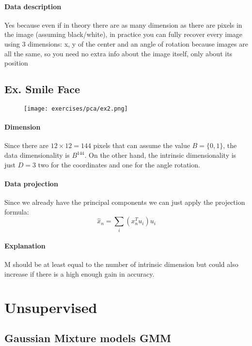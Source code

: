 \paragraph{Data description}
Yes because even if in theory there are as many dimension as there are pixels in the image (assuming black/white), in practice you can fully recover every image using 3 dimensions: x, y of the center and an angle of rotation because images are all the same, so you need no extra info about the image itself, only about its position

\subsection{Ex. Smile Face }

\begin{figure}[H]
    \centering
    \texttt{[image: exercises/pca/ex2.png]}
\end{figure}

\paragraph{Dimension}
Since there are $12\times 12=144$ pixels that can assume the value $B=\{0,1\}$, the data dimensionality is $B^{144} $. On the other hand, the intrinsic dimensionality is just $D=3$ two for the coordinates and one for the angle rotation.

\paragraph{Data projection}
Since we already have the principal components we can just apply the projection formula:
$$\hat{x}_n=\sum_i(x^T_nu_i)u_i$$

\paragraph{Explanation}
M should be at least equal to the number of intrinsic dimension but could also increase if there is a high enough gain in accuracy.



\section{Unsupervised}



\subsection{Gaussian Mixture models GMM}

